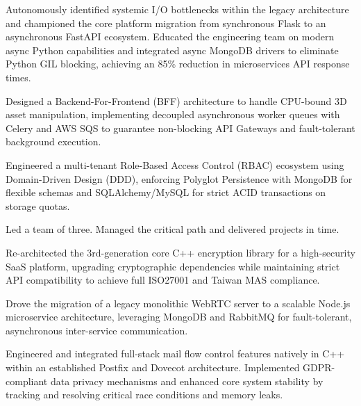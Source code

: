 \begin{resumeitems}
\item Autonomously identified systemic I/O bottlenecks within the legacy architecture and championed the core platform migration from synchronous Flask to an asynchronous FastAPI ecosystem. Educated the engineering team on modern async Python capabilities and integrated async MongoDB drivers to eliminate Python GIL blocking, achieving an 85\% reduction in microservices API response times.
\item Designed a Backend-For-Frontend (BFF) architecture to handle CPU-bound 3D asset manipulation, implementing decoupled asynchronous worker queues with Celery and AWS SQS to guarantee non-blocking API Gateways and fault-tolerant background execution.
\item Engineered a multi-tenant Role-Based Access Control (RBAC) ecosystem using Domain-Driven Design (DDD), enforcing Polyglot Persistence with MongoDB for flexible schemas and SQLAlchemy/MySQL for strict ACID transactions on storage quotas.
\end{resumeitems}
\begin{resumeitems}
\item Led a team of three. Managed the critical path and delivered projects in time.
\item Re-architected the 3rd-generation core C++ encryption library for a high-security SaaS platform, upgrading cryptographic dependencies while maintaining strict API compatibility to achieve full ISO27001 and Taiwan MAS compliance.
\item Drove the migration of a legacy monolithic WebRTC server to a scalable Node.js microservice architecture, leveraging MongoDB and RabbitMQ for fault-tolerant, asynchronous inter-service communication.
\end{resumeitems}
\begin{resumeitems}
\item Engineered and integrated full-stack mail flow control features natively in C++ within an established Postfix and Dovecot architecture. Implemented GDPR-compliant data privacy mechanisms and enhanced core system stability by tracking and resolving critical race conditions and memory leaks.
\end{resumeitems}
